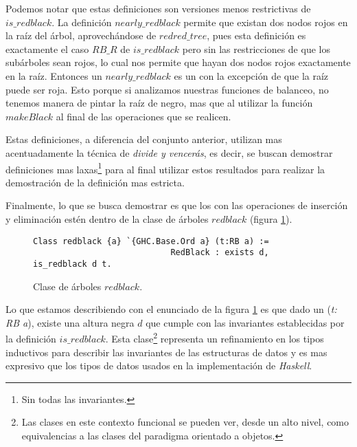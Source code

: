Podemos notar que estas definiciones son versiones menos restrictivas de 
\hyperref[inductive_isRedB]{$is\_redblack$}. La definici\'on 
\hyperref[inductive_isRedB]{$nearly\_redblack$} permite que existan dos nodos rojos en la ra\'iz del 
\'arbol, aprovech\'andose de \hyperref[inductive_isRedB]{$redred\_tree$}, pues esta definici\'on es 
exactamente el caso $RB\_R$ de \hyperref[inductive_isRedB]{$is\_redblack$} pero sin las 
restricciones de que los sub\'arboles sean rojos, lo cual nos permite que hayan dos nodos rojos 
exactamente en la ra\'iz. Entonces un \hyperref[inductive_isRedB]{$nearly\_redblack$} es un {\arn} 
con la excepci\'on de que la ra\'iz puede ser roja. Esto porque si analizamos nuestras funciones de 
balanceo, no tenemos manera de pintar la raíz de negro, mas que al utilizar la función 
\hyperref[raiz_negra_func]{$makeBlack$} al final de las operaciones que se realicen. 

Estas definiciones, a diferencia del conjunto anterior, utilizan mas acentuadamente la t\'ecnica de 
\textit{divide y vencerás}, es decir, se buscan demostrar definiciones mas laxas\footnote{Sin todas 
las invariantes.} para al final utilizar estos resultados para realizar la demostraci\'on de la 
definición mas estricta.

Finalmente, lo que se busca demostrar es que los {\arns} con las operaciones de inserci\'on y
eliminaci\'on est\'en dentro de la clase de \'arboles $redblack$ (figura \ref{class_rb}).

\begin{figure}[!ht]
\centering
\captionsetup{justification=centering}
\begin{verbatim}
Class redblack {a} `{GHC.Base.Ord a} (t:RB a) :=
                            RedBlack : exists d, is_redblack d t.
\end{verbatim}
\caption{Clase de \'arboles $redblack$.}
\label{class_rb}
\end{figure}

Lo que estamos describiendo con el enunciado de la figura \ref{class_rb} es que dado un {\arn} 
(\textit{t: RB a}), existe una altura negra $d$ que cumple con las invariantes establecidas por la 
definici\'on \hyperref[inductive_isRedB]{$is\_redblack$}. Esta clase\footnote{Las clases en este 
contexto funcional se pueden ver, desde un alto nivel, como equivalencias a las clases del paradigma 
orientado a objetos.} representa un refinamiento en los tipos inductivos para describir las 
invariantes de las estructuras de datos y es mas expresivo que los tipos de datos usados en la 
implementaci\'on de \textit{Haskell}.

